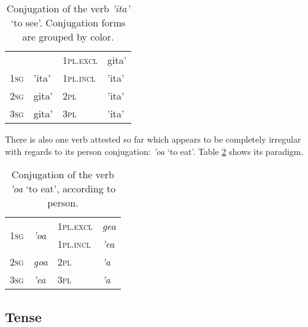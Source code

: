 \documentclass[12pt]{article}
\begin{document}
\begin{table}[h]
\caption{Conjugation of the verb \textit{'ita'} `to see'. Conjugation forms are grouped by color.}
\label{tab:par}
\begin{tabular}{@{}llll@{}}
\toprule
{\color[HTML]{6665CD} }                               & {\color[HTML]{6665CD} }                        & {\color[HTML]{00D2CB} \textsc{1pl.excl}} & {\color[HTML]{00D2CB} gita'} \\
\multirow{-2}{*}{{\color[HTML]{6665CD} \textsc{1sg}}} & \multirow{-2}{*}{{\color[HTML]{6665CD} 'ita'}} & {\color[HTML]{6665CD} \textsc{1pl.incl}} & {\color[HTML]{6665CD} 'ita'} \\
{\color[HTML]{00D2CB} \textsc{2sg}}                   & {\color[HTML]{00D2CB} gita'}                   & {\color[HTML]{6665CD} \textsc{2pl}}      & {\color[HTML]{6665CD} 'ita'} \\
{\color[HTML]{00D2CB} \textsc{3sg}}                   & {\color[HTML]{00D2CB} gita'}                   & {\color[HTML]{6665CD} \textsc{3pl}}      & {\color[HTML]{6665CD} 'ita'} \\ \bottomrule
\end{tabular}
\end{table}

There is also one verb attested so far which appears to be completely irregular with regards to its person conjugation: \textit{'oa} `to eat'. Table \ref{tab:goa} shows its paradigm.


\begin{table}[h]
\caption{Conjugation of the verb \textit{'oa} `to eat', according to person.}
\label{tab:goa}
\begin{tabular}{@{}llll@{}}
\toprule
\multirow{2}{*}{\textsc{1sg}} & \multirow{2}{*}{\textit{'oa}} & \textsc{1pl.excl} & \textit{gea} \\
                              &                               & \textsc{1pl.incl} & \textit{'ea} \\
\textsc{2sg}                  & \textit{goa}                  & \textsc{2pl}      & \textit{'a}  \\
\textsc{3sg}                  & \textit{'ea}                  & \textsc{3pl}      & \textit{'a}  \\ \bottomrule
\end{tabular}
\end{table}

\subsection{Tense}
\end{document}
